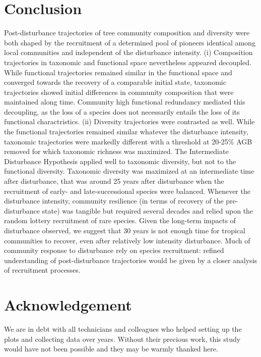 \documentclass[fleqn,10pt]{ArtEcoFoG} %
\begin{document}
\section{Conclusion}\label{conclusion}

Post-disturbance trajectories of tree community composition and
diversity were both shaped by the recruitment of a determined pool of
pioneers identical among local communities and independent of the
disturbance intensity. (i) Composition trajectories in taxonomic and
functional space nevertheless appeared decoupled. While functional
trajectories remained similar in the functional space and converged
towards the recovery of a comparable initial state, taxonomic
trajectories showed initial differences in community composition that
were maintained along time. Community high functional redundancy
mediated this decoupling, as the loss of a species does not necessarily
entails the loss of its functional charactristics. (ii) Diversity
trajectories were contrasted as well. While the functional trajectories
remained similar whatever the disturbance intensity, taxonomic
trajectories were markedly different with a threshold at 20-25\% AGB
removed for which taxonomic richness was maximized. The Intermediate
Disturbance Hypothesis applied well to taxonomic diversity, but not to
the functional diversity. Taxonomic diversity was maximized at an
intermediate time after disturbance, that was around 25 years after
disturbance when the recruitment of early- and late-successional species
were balanced. Whenever the disturbance intensity, community resilience
(in terms of recovery of the pre-disturbance state) was tangible but
required several decades and relied upon the random lottery recruitment
of rare species. Given the long-term impacts of disturbance observed, we
suggest that 30 years is not enough time for tropical communities to
recover, even after relatively low intensity disturbance. Much of
community response to disturbance rely on species recruitment: refined
understanding of post-disturbance trajectories would be given by a
closer analysis of recruitment processes.

\section{Acknowledgement}\label{acknowledgement}

We are in debt with all technicians and colleagues who helped setting up
the plots and collecting data over years. Without their precious work,
this study would have not been possible and they may be warmly thanked
here.
\end{document}
